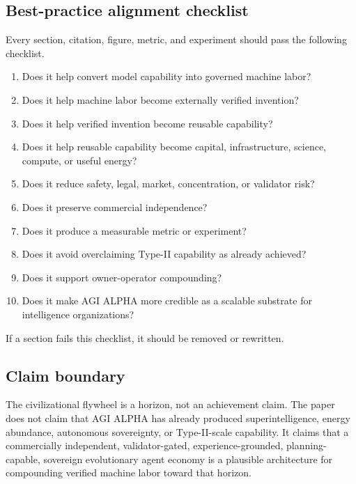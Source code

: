 \documentclass[11pt]{article}
\providecommand{\tightlist}{\setlength{\itemsep}{0pt}\setlength{\parskip}{0pt}}
\begin{document}
\subsection{Best-practice alignment checklist}\label{best-practice-alignment-checklist}

Every section, citation, figure, metric, and experiment should pass the following checklist.

\begin{enumerate}
\def\labelenumi{\arabic{enumi}.}
\tightlist
\item
  Does it help convert model capability into governed machine labor?
\item
  Does it help machine labor become externally verified invention?
\item
  Does it help verified invention become reusable capability?
\item
  Does it help reusable capability become capital, infrastructure, science, compute, or useful energy?
\item
  Does it reduce safety, legal, market, concentration, or validator risk?
\item
  Does it preserve commercial independence?
\item
  Does it produce a measurable metric or experiment?
\item
  Does it avoid overclaiming Type-II capability as already achieved?
\item
  Does it support owner-operator compounding?
\item
  Does it make AGI ALPHA more credible as a scalable substrate for intelligence organizations?
\end{enumerate}

If a section fails this checklist, it should be removed or rewritten.

\subsection{Claim boundary}\label{claim-boundary}

The civilizational flywheel is a horizon, not an achievement claim. The paper does not claim that AGI ALPHA has already produced superintelligence, energy abundance, autonomous sovereignty, or Type-II-scale capability. It claims that a commercially independent, validator-gated, experience-grounded, planning-capable, sovereign evolutionary agent economy is a plausible architecture for compounding verified machine labor toward that horizon.
\end{document}
